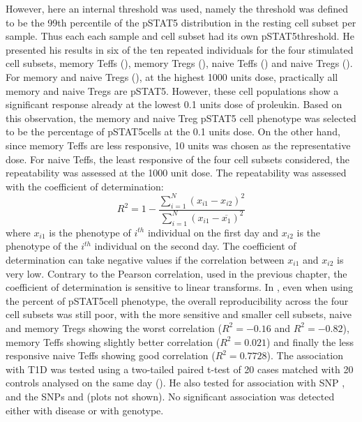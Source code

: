 However, here an internal threshold was used, namely
the threshold was defined to be the 99th percentile of the pSTAT5 distribution in the resting cell subset per sample.
Thus each each sample and cell subset had its own pSTAT5\positive threshold.
He presented his results in six of the ten repeated individuals for the four stimulated cell subsets,
memory Teffs (),
memory Tregs (),
naive Teffs ()
and naive Tregs ().
For memory and naive Tregs (), at the highest 1000 units dose,
practically all memory and naive Tregs are pSTAT5\positive.
However, these cell populations show a significant response already at the lowest 0.1 units dose of proleukin.
Based on this observation, the memory and naive Treg pSTAT5 cell phenotype was selected to be the percentage of pSTAT5\positive cells at the 0.1 units dose.
On the other hand, since memory Teffs are less responsive, 10 units was chosen as the representative dose.
For naive Teffs, the least responsive of the four cell subsets considered, the repeatability was assessed at the 1000 unit dose.
The repeatability was assessed with the coefficient of determination:
\[
  R^2 = 1 - \frac{\sum_{i=1}^N (x_{i1}-x_{i2})^2}{\sum_{i=1}^N (x_{i1}-\overline{x_1})^2}
\]
where $x_{i1}$ is the phenotype of $i^{th}$ individual on the first day and $x_{i2}$
is the phenotype of the $i^{th}$ individual on the second day.
The coefficient of determination can take negative values if the correlation between $x_{i1}$ and $x_{i2}$ is very low.
Contrary to the Pearson correlation, used in the previous chapter, the coefficient of determination is sensitive to linear transforms.
In , even when using the percent of pSTAT5\positive cell phenotype, the overall reproducibility across the four cell subsets was still poor, with the more sensitive and smaller cell subsets, naive and memory Tregs showing the worst correlation ($R^2=-0.16$ and $R^2=-0.82$), memory Teffs showing slightly better correlation ($R^2=0.021$) and finally the less responsive naive Teffs showing good correlation ($R^2=0.7728$).
The association with \gls{T1D} was tested using a two-tailed paired t-test of 20 cases matched with 20 controls analysed on the same day ().
He also tested for association with  SNP , and the
 SNPs  and  (plots not shown).
No significant association was detected either with disease or with genotype.


